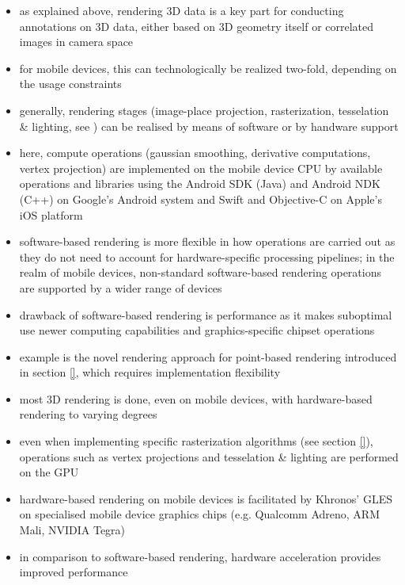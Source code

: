 \documentclass[review]{elsarticle}
\begin{document}
\begin{itemize}
\item as explained above, rendering 3D data is a key part for conducting annotations on 3D data, either based on 3D geometry itself or correlated images in camera space
\item for mobile devices, this can technologically be realized two-fold, depending on the usage constraints
\item generally, rendering stages (image-place projection, rasterization, tesselation \& lighting, see \cite{Kessenich2016}) can be realised by means of software or by handware support
\item here, compute operations (gaussian smoothing, derivative computations, vertex projection) are implemented on the mobile device CPU by available operations and libraries using the Android SDK (Java) and Android NDK (C++) on Google's Android system and Swift and Objective-C on Apple's iOS platform
\item software-based rendering is more flexible in how operations are carried out as they do not need to account for hardware-specific processing pipelines; in the realm of mobile devices, non-standard software-based rendering operations are supported by a wider range of devices
\item drawback of software-based rendering is performance as it makes suboptimal use newer computing capabilities and graphics-specific chipset operations
\item example is the novel rendering approach for point-based rendering introduced in section \ref{}, which requires implementation flexibility
\item most 3D rendering is done, even on mobile devices, with hardware-based rendering to varying degrees
\item even when implementing specific rasterization algorithms (see section \ref{}), operations such as vertex projections and tesselation \& lighting are performed on the GPU
\item hardware-based rendering on mobile devices is facilitated by Khronos' \gls{GLES} \cite{Mehta2013} on specialised mobile device graphics chips (e.g. Qualcomm Adreno, ARM Mali, NVIDIA Tegra)
\item in comparison to software-based rendering, hardware acceleration provides improved performance

\end{itemize}
\end{document}
